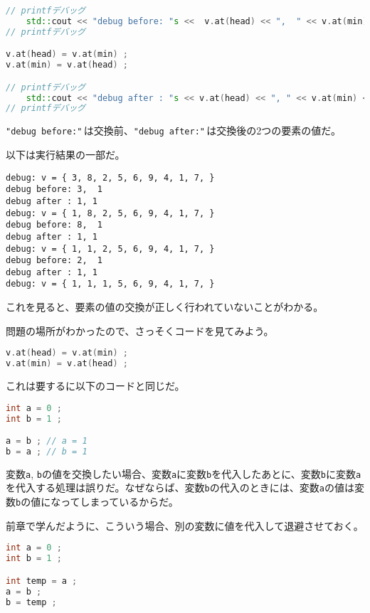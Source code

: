 \begin{lstlisting}[language={C++}]
// printfデバッグ 
    std::cout << "debug before: "s <<  v.at(head) << ",  " << v.at(min) << "\n"s ;
// printfデバッグ

v.at(head) = v.at(min) ;
v.at(min) = v.at(head) ;

// printfデバッグ
    std::cout << "debug after : "s << v.at(head) << ", " << v.at(min) << "\n"s ;
// printfデバッグ
\end{lstlisting}

\texttt{"debug before:"}\,は交換前、\texttt{"debug after:"}\,は交換後の2つの要素の値だ。

以下は実行結果の一部だ。

\ifTombow\pagebreak\fi
\begin{lstlisting}[style=terminal]
debug: v = { 3, 8, 2, 5, 6, 9, 4, 1, 7, }
debug before: 3,  1
debug after : 1, 1
debug: v = { 1, 8, 2, 5, 6, 9, 4, 1, 7, }
debug before: 8,  1
debug after : 1, 1
debug: v = { 1, 1, 2, 5, 6, 9, 4, 1, 7, }
debug before: 2,  1
debug after : 1, 1
debug: v = { 1, 1, 1, 5, 6, 9, 4, 1, 7, }
\end{lstlisting}

これを見ると、要素の値の交換が正しく行われていないことがわかる。

問題の場所がわかったので、さっそくコードを見てみよう。

\begin{lstlisting}[language={C++}]
v.at(head) = v.at(min) ;
v.at(min) = v.at(head) ;
\end{lstlisting}

これは要するに以下のコードと同じだ。

\begin{lstlisting}[language={C++}]
int a = 0 ;
int b = 1 ;

a = b ; // a = 1
b = a ; // b = 1
\end{lstlisting}

変数\texttt{a}, \texttt{b}の値を交換したい場合、変数\texttt{a}に変数\texttt{b}を代入したあとに、変数\texttt{b}に変数\texttt{a}を代入する処理は誤りだ。なぜならば、変数\texttt{b}の代入のときには、変数\texttt{a}の値は変数\texttt{b}の値になってしまっているからだ。

前章で学んだように、こういう場合、別の変数に値を代入して退避させておく。

\begin{lstlisting}[language={C++}]
int a = 0 ;
int b = 1 ;

int temp = a ;
a = b ;
b = temp ;
\end{lstlisting}

